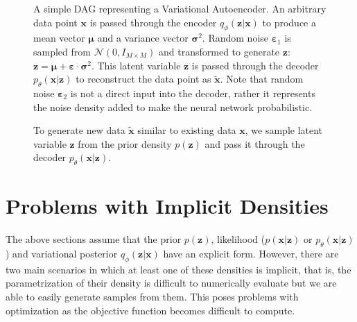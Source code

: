 \documentclass[honours,12pt, twoside]{unswthesis}
\numberwithin{equation}{section}
\theoremstyle{definition}
\begin{document}
\begin{figure}[h]
  \centering
   \caption{\small A simple DAG representing a Variational Autoencoder. An arbitrary data point $\bm{x}$ is passed through the encoder $q_\phi(\bm{z}|\bm{x})$ to produce a mean vector $\bm{\mu}$ and a variance vector $\bm{\sigma}^2$. Random noise $\bm{\varepsilon}_1$ is sampled from $\mathcal{N}(0,I_{M\times M})$ and transformed to generate $\bm{z}$: $\bm{z}=\bm{\mu}+\bm{\varepsilon}\cdot \bm{\sigma}^2$. This latent variable $\bm{z}$ is passed through the decoder $p_\theta(\bm{x}|\bm{z})$ to reconstruct the data point as $\tilde{\bm{x}}$. Note that random noise $\bm{\varepsilon}_2$ is not a direct input into the decoder, rather it represents the noise density added to make the neural network probabilistic.}
   \label{fig:3.3}
\end{figure}
\begin{figure}[h]
  \centering
   \caption{\small To generate new data $\tilde{\bm{x}}$ similar to existing data $\bm{x}$, we sample latent variable $\bm{z}$ from the prior density $p(\bm{z})$ and pass it through the decoder $p_\theta(\bm{x}|\bm{z})$.}
   \label{fig:3.4}
\end{figure}
\section{Problems with Implicit Densities}\label{sec:3.8}
The above sections assume that the prior $p(\bm{z})$, likelihood ($p(\bm{x}|\bm{z})$ or $p_\theta(\bm{x}|\bm{z})$) and variational posterior $q_\phi(\bm{z}|\bm{x})$ have an explicit form. However, there are two main scenarios in which at least one of these densities is implicit, that is, the parametrization of their density is difficult to numerically evaluate but we are able to easily generate samples from them. This poses problems with optimization as the objective function becomes difficult to compute. 
\end{document}
